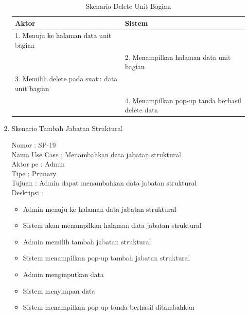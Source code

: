 \begin{enumerate}
\begin{itemize}
\end{itemize}

\begin{table}
	\caption{Skenario Delete Unit Bagian}
	\centering
	\begin{tabular}{ | p{55mm} | p{70mm} |}
		\hline 
		\textbf{Aktor} & \textbf{Sistem} \\
		\hline
		
		1.	Menuju ke halaman data unit bagian &  \\
		
		\hline
		
		&  2.	Menampilkan halaman data unit bagian \\
		
		\hline
		
		3. Memilih delete pada suatu data unit bagian & \\
		
		\hline
		
		& 4.	Menampilkan pop-up tanda berhasil delete data \\
		\hline
		
	\end{tabular}
\end{table}

\item Skenario Tambah Jabatan Struktural

Nomor \kern 3.6pc : SP-19 \\
Nama Use Case : Menambahkan data jabatan struktural \\
Aktor  pc : Admin \\
Tipe \kern 4.6pc : Primary \\
Tujuan \kern 3.6pc : Admin dapat menambahkan data jabatan struktural\\
Deskripsi \kern 2.5pc : 

\begin{itemize}
	\item Admin menuju ke halaman data jabatan struktural
	\item Sistem akan menampilkan halaman data jabatan struktural
	\item Admin memilih tambah jabatan struktural
	\item Sistem menampilkan pop-up tambah jabatan struktural
	\item Admin menginputkan data
	\item Sistem menyimpan data
	\item Sistem menampilkan pop-up tanda berhasil ditambahkan
	
\end{itemize}


\end{enumerate}

